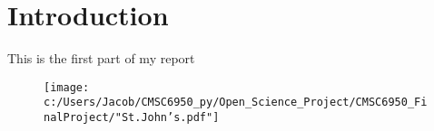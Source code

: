 \documentclass{article}
\begin{document}
\section{Introduction}
This is the first part of my report
\begin{figure}
\centerline{\texttt{[image: c:/Users/Jacob/CMSC6950\_py/Open\_Science\_Project/CMSC6950\_FinalProject/"St.John's.pdf"]}}
\end{figure}
\end{document}
